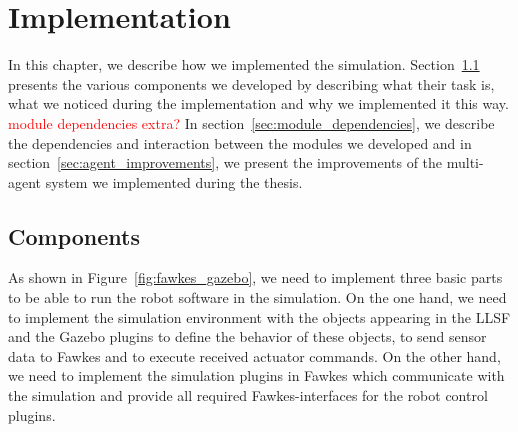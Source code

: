 \chapter{Implementation}
\label{cha:implementation}
In this chapter, we describe how we implemented the simulation. Section~\ref{sec:components} presents the various components we developed by describing what their task is, what we noticed during the implementation and why we implemented it this way. \textcolor{red}{module dependencies extra?} In section~\ref{sec:module_dependencies}, we describe the dependencies and interaction between the modules we developed and in section~\ref{sec:agent_improvements}, we present the improvements of the multi-agent system we implemented during the thesis.

\section{Components}
\label{sec:components}
As shown in Figure~\ref{fig:fawkes_gazebo}, we need to implement three basic parts to be able to run the robot software in the simulation. On the one hand, we need to implement the simulation environment with the objects appearing in the LLSF and the Gazebo plugins to define the behavior of these objects, to send sensor data to Fawkes and to execute received actuator commands. On the other hand, we need to implement the simulation plugins in Fawkes which communicate with the simulation and provide all required Fawkes-interfaces for the robot control plugins.

